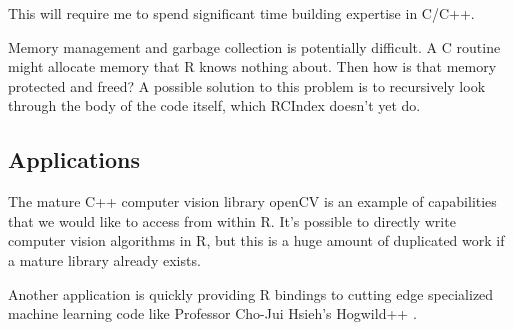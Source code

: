 \documentclass[12pt]{article}
\begin{document}
This will require me to spend significant time building expertise in C/C++.

Memory management and garbage collection is potentially difficult. A C
routine might allocate memory that R knows nothing about. Then how is that
memory protected and freed? A possible solution to this problem is to
recursively look
through the body of the code itself, which RCIndex doesn't yet do.

\subsection{Applications}

The mature C++ computer vision library openCV
\cite{opencv_library} is an example of capabilities that we would like to
access from within R. It's possible to directly write computer vision
algorithms in R, but this is a huge amount of duplicated work if a mature
library already exists.

Another application is quickly providing R bindings to cutting edge
specialized machine learning code like Professor Cho-Jui Hsieh's Hogwild++
\cite{zhang2016hogwild}.

\newpage

 
\end{document}
